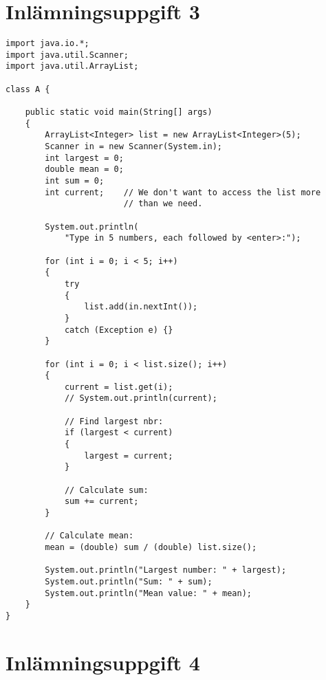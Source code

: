 \documentclass[a4paper,12pt]{article}
\begin{document}
\section{\textsf{Inlämningsuppgift 3}}
\begin{verbatim}
import java.io.*;
import java.util.Scanner;
import java.util.ArrayList;

class A {

    public static void main(String[] args)
    {
        ArrayList<Integer> list = new ArrayList<Integer>(5);
        Scanner in = new Scanner(System.in);
        int largest = 0;
        double mean = 0;
        int sum = 0;
        int current;    // We don't want to access the list more 
                        // than we need.

        System.out.println(
            "Type in 5 numbers, each followed by <enter>:");

        for (int i = 0; i < 5; i++)
        {
            try
            {
                list.add(in.nextInt());
            }
            catch (Exception e) {}
        }

        for (int i = 0; i < list.size(); i++)
        {
            current = list.get(i);
            // System.out.println(current);

            // Find largest nbr:
            if (largest < current)
            {
                largest = current;
            }

            // Calculate sum:
            sum += current;
        }

        // Calculate mean:
        mean = (double) sum / (double) list.size();

        System.out.println("Largest number: " + largest);
        System.out.println("Sum: " + sum);
        System.out.println("Mean value: " + mean);
    }
}
\end{verbatim}


\newpage
\section{\textsf{Inlämningsuppgift 4}}
\end{document}
